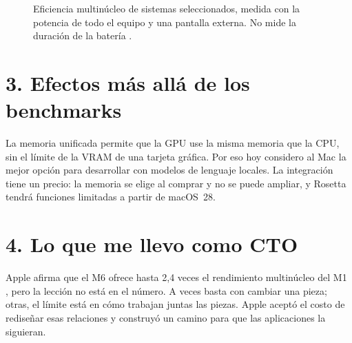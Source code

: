 \documentclass[11pt,letterpaper]{article}
\begin{document}
\begin{figure}[H]
\centering
{}
\caption{Eficiencia multinúcleo de sistemas seleccionados, medida con la
potencia de todo el equipo y una pantalla externa. No mide la duración de la
batería \parencite{notebookcheck2026}.}
\label{fig:eficiencia}
\end{figure}

\section*{3. Efectos más allá de los benchmarks}

La memoria unificada permite que la GPU use la misma memoria que la CPU, sin
el límite de la VRAM de una tarjeta gráfica. Por eso hoy considero al Mac la
mejor opción para desarrollar con modelos de lenguaje locales. La integración
tiene un precio: la memoria se elige al comprar y no se puede ampliar, y
Rosetta tendrá funciones limitadas a partir de macOS~28.

\section*{4. Lo que me llevo como CTO}

Apple afirma que el M6 ofrece hasta 2,4 veces el rendimiento multinúcleo
del M1 \parencite{apple2026m6}, pero la lección no está en el número. A veces basta
con cambiar una pieza; otras, el límite está en cómo trabajan juntas las
piezas. Apple aceptó el costo de rediseñar esas relaciones y construyó un
camino para que las aplicaciones la siguieran.

\printbibliography[title={Referencias}]
\end{document}

